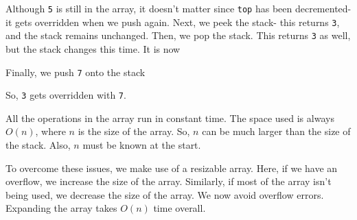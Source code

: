 \documentclass[a4paper, openany]{memoir}
\begin{document}
Although \texttt{5} is still in the array, it doesn't matter since \texttt{top} has been decremented- it gets overridden when we push again. Next, we peek the stack- this returns \texttt{3}, and the stack remains unchanged. Then, we pop the stack. This returns \texttt{3} as well, but the stack changes this time. It is now
\begin{center}
\end{center}
Finally, we push \texttt{7} onto the stack
\begin{center}
\end{center}
So, \texttt{3} gets overridden with \texttt{7}.

\noindent All the operations in the array run in constant time. The space used is always $O(n)$, where $n$ is the size of the array. So, $n$ can be much larger than the size of the stack. Also, $n$ must be known at the start.

\noindent To overcome these issues, we make use of a resizable array. Here, if we have an overflow, we increase the size of the array. Similarly, if most of the array isn't being used, we decrease the size of the array. We now avoid overflow errors. Expanding the array takes $O(n)$ time overall. 
\end{document}
